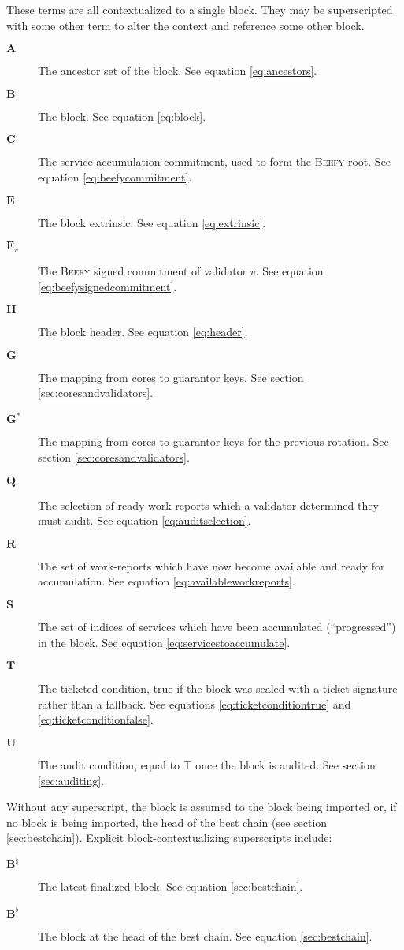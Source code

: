 These terms are all contextualized to a single block. They may be superscripted with some other term to alter the context and reference some other block.
\begin{description}
  \item[$\mathbf{A}$] The ancestor set of the block. See equation \ref{eq:ancestors}.
  \item[$\mathbf{B}$] The block. See equation \ref{eq:block}.
  \item[$\mathbf{C}$] The service accumulation-commitment, used to form the \textsc{Beefy} root. See equation \ref{eq:beefycommitment}.
  \item[$\mathbf{E}$] The block extrinsic. See equation \ref{eq:extrinsic}.
  \item[$\mathbf{F}_v$] The \textsc{Beefy} signed commitment of validator $v$. See equation \ref{eq:beefysignedcommitment}.
  \item[$\mathbf{H}$] The block header. See equation \ref{eq:header}.
  \item[$\mathbf{G}$] The mapping from cores to guarantor keys. See section \ref{sec:coresandvalidators}.
  \item[$\mathbf{G^*}$] The mapping from cores to guarantor keys for the previous rotation. See section \ref{sec:coresandvalidators}.
  \item[$\mathbf{Q}$] The selection of ready work-reports which a validator determined they must audit. See equation \ref{eq:auditselection}.
  \item[$\mathbf{R}$] The set of work-reports which have now become available and ready for accumulation. See equation \ref{eq:availableworkreports}.
  \item[$\mathbf{S}$] The set of indices of services which have been accumulated (``progressed'') in the block. See equation \ref{eq:servicestoaccumulate}.
  \item[$\mathbf{T}$] The ticketed condition, true if the block was sealed with a ticket signature rather than a fallback. See equations \ref{eq:ticketconditiontrue} and \ref{eq:ticketconditionfalse}.
  \item[$\mathbf{U}$] The audit condition, equal to $\top$ once the block is audited. See section \ref{sec:auditing}.
\end{description}

Without any superscript, the block is assumed to the block being imported or, if no block is being imported, the head of the best chain (see section \ref{sec:bestchain}). Explicit block-contextualizing superscripts include:
\begin{description}
  \item[$\mathbf{B}^\natural$] The latest finalized block. See equation \ref{sec:bestchain}.
  \item[$\mathbf{B}^\flat$] The block at the head of the best chain. See equation \ref{sec:bestchain}.
\end{description}

